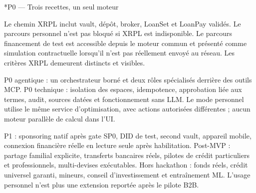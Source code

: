 \documentclass[10pt,a4paper]{article}
\makeatletter
\newcommand{\needroom}[1]{}
\renewcommand\subsection{\@startsection{subsection}{2}{0pt}{10pt plus 1pt minus 1pt}{4pt}{\bfseries\fontsize{10.5}{14}\selectfont\color{ink}}}
\makeatother
\begin{document}
\needroom{65pt}\subsection*{P0 — Trois recettes, un seul moteur}
\par{}\par\vspace{6pt}
Le chemin XRPL inclut vault, dépôt, broker, LoanSet et LoanPay validés. Le parcours personnel n'est pas bloqué si XRPL est indisponible. Le parcours financement de test est accessible depuis le moteur commun et présenté comme simulation contractuelle lorsqu'il n'est pas réellement envoyé au réseau. Les critères XRPL demeurent distincts et visibles.\par

P0 agentique : un orchestrateur borné et deux rôles spécialisés derrière des outils MCP. P0 technique : isolation des espaces, idempotence, approbation liée aux termes, audit, sources datées et fonctionnement sans LLM. Le mode personnel utilise le même service d'optimisation, avec actions autorisées différentes ; aucun moteur parallèle de calcul dans l'UI.\par

P1 : sponsoring natif après gate SP0, DID de test, second vault, appareil mobile, connexion financière réelle en lecture seule après habilitation. Post-MVP : partage familial explicite, transferts bancaires réels, pilotes de crédit particuliers et professionnels, multi-devises exécutables. Hors hackathon : fonds réels, crédit universel garanti, mineurs, conseil d'investissement et entraînement ML. L'usage personnel n'est plus une extension reportée après le pilote B2B.\par
\end{document}
